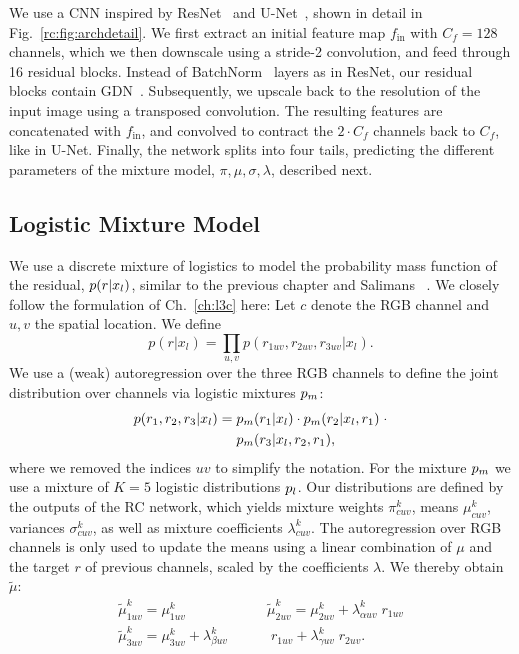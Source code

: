 We use a CNN inspired by ResNet~\cite{he2016deep} and U-Net~\cite{ronneberger2015u}, shown in detail in Fig.~\ref{rc:fig:archdetail}. We first extract an initial feature map $f_\text{in}$ with $C_f=128$ channels, which we then downscale using a stride-2 convolution, and feed through 16 residual blocks. Instead of BatchNorm~\cite{ioffe2015batch} layers as in ResNet, our residual blocks contain GDN~\cite{balle2015density}. Subsequently, we upscale back to the resolution of the input image using a transposed convolution. The resulting features are concatenated with $f_\text{in}$, and convolved to contract the $2\cdot C_f$ channels back to $C_f$, like in U-Net.
Finally, the network splits into four tails, predicting the different parameters of the mixture model, $\pi, \mu, \sigma, \lambda$, described next.

\subsection{Logistic Mixture Model} \label{rc:sec:dmol}
We use a discrete mixture of logistics to model the probability mass function of the residual, $p(r|x_l)$, similar to the previous chapter and Salimans \etal~\cite{Salimans2017pcnnpp}. We closely follow the formulation of Ch.~\ref{ch:l3c} here:
Let $c$ denote the RGB channel and $u,v$ the spatial location. 
We define 
\begin{equation}
    p(r|x_l) = \prod_{u,v} p(r_{1uv},r_{2uv},r_{3uv}|x_l). \label{rc:p_x_factorization}
\end{equation}
We use a (weak) autoregression over the three RGB channels to define the joint distribution over channels via logistic mixtures $p_m$:
\begin{align}
    p(r_1, r_2, r_3 | x_l) =\;&p_m(r_1 | x_l) \cdot p_m(r_2 | x_l, r_1) \; \cdot \nonumber \\
                                 &p_m(r_3 | x_l, r_2, r_1),
    \label{rc:eq:p_joint}
\end{align}
where we removed the indices $uv$ to simplify the notation.
    For the mixture $p_m$ we use a mixture of $K=5$ logistic distributions $p_l$. Our distributions are defined by the outputs of the RC network, which yields mixture weights
    $\pi^k_{cuv}$, means $\mu^k_{cuv}$, variances $\sigma^k_{cuv}$, as well as mixture coefficients $\lambda^k_{cuv}$.
    The autoregression over RGB channels is only used to update the means using a linear combination of $\mu$ and the target $r$ of previous channels, scaled by the coefficients $\lambda$. We thereby obtain $\tilde \mu$:
\begin{align}
    \tilde \mu^k_{1uv} = \mu^k_{1uv} \nonumber \hspace{5em}
    &\tilde \mu^k_{2uv} = \mu^k_{2uv} + \lambda^k_{\alpha uv} \; r_{1uv} \nonumber  \\
    \tilde \mu^k_{3uv} = \mu^k_{3uv} + \lambda^k_{\beta uv} &\; r_{1uv} + \lambda^k_{\gamma uv} \; r_{2uv}.
    \label{rc:eq:updating_mus}
\end{align}

